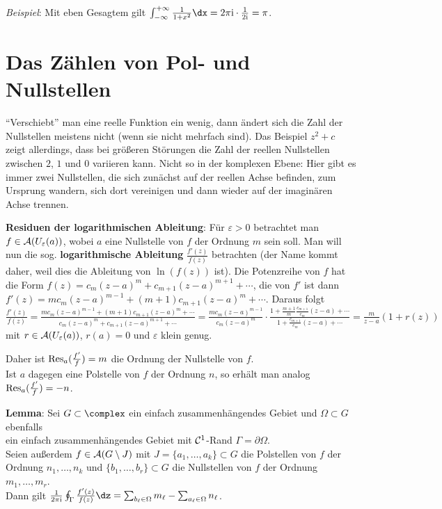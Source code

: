 \emph{Beispiel}:
Mit eben Gesagtem gilt $\int_{-\infty}^{+\infty} \frac{1}{1 + x^2} \dx =
2\pi\i \cdot \frac{1}{2\i} = \pi$.

\pagebreak

\section{%
    Das Zählen von Pol- und Nullstellen%
}

"`Verschiebt"' man eine reelle Funktion ein wenig, dann ändert sich die
Zahl der Nullstellen meistens nicht (wenn sie nicht mehrfach sind).
Das Beispiel $z^2 + c$ zeigt allerdings, dass bei größeren Störungen
die Zahl der reellen Nullstellen zwischen $2$, $1$ und $0$ variieren kann.
Nicht so in der komplexen Ebene:
Hier gibt es immer zwei Nullstellen, die sich zunächst auf der reellen Achse
befinden, zum Ursprung wandern, sich dort vereinigen und dann wieder auf
der imaginären Achse trennen.

\linie

\textbf{Residuen der logarithmischen Ableitung}:
Für $\varepsilon > 0$ betrachtet man $f \in \mathcal{A}(U_\varepsilon(a))$, wobei
$a$ eine Nullstelle von $f$ der Ordnung $m$ sein soll.
Man will nun die sog. \textbf{logarithmische Ableitung} $\frac{f'(z)}{f(z)}$
betrachten (der Name kommt daher, weil dies die Ableitung von $\ln(f(z))$ ist).
Die Potenzreihe von $f$ hat die Form
$f(z) = c_m (z - a)^m + c_{m+1} (z - a)^{m+1} + \dotsb$,
die von $f'$ ist dann
$f'(z) = m c_m (z - a)^{m-1} + (m + 1) c_{m+1} (z - a)^m + \dotsb$.
Daraus folgt\\
$\frac{f'(z)}{f(z)} =
\frac{m c_m (z - a)^{m-1} + (m + 1) c_{m+1} (z - a)^m + \dotsb}
{c_m (z - a)^m + c_{m+1} (z - a)^{m+1} + \dotsb} =
\frac{m c_m (z - a)^{m-1}}{c_m (z - a)^m} \cdot
\frac{1 + \frac{m + 1}{m} \frac{c_{m+1}}{c_m} (z - a) + \dotsb}
{1 + \frac{c_{m+1}}{c_m} (z - a) + \dotsb} =
\frac{m}{z - a} (1 + r(z))$ mit $r \in \mathcal{A}(U_\varepsilon(a))$, $r(a) = 0$ und
$\varepsilon$ klein genug.

Daher ist $\operatorname{Res}_a(\frac{f'}{f}) = m$ die Ordnung der Nullstelle von $f$.\\
Ist $a$ dagegen eine Polstelle von $f$ der Ordnung $n$, so erhält man analog
$\operatorname{Res}_a(\frac{f'}{f}) = -n$.

\linie

\textbf{Lemma}:
Sei $G \subset \complex$ ein einfach zusammenhängendes Gebiet und
$\Omega \subset G$ ebenfalls\\
ein einfach zusammenhängendes Gebiet mit
$\mathcal{C}^1$-Rand $\Gamma = \partial \Omega$.\\
Seien außerdem $f \in \mathcal{A}(G \setminus J)$ mit
$J = \{a_1, \dotsc, a_k\} \subset G$ die
Polstellen von $f$ der Ordnung $n_1, \dotsc, n_k$ und
$\{b_1, \dotsc, b_r\} \subset G$ die Nullstellen von $f$
der Ordnung $m_1, \dotsc, m_r$.\\
Dann gilt $\frac{1}{2\pi\i} \oint_\Gamma \frac{f'(z)}{f(z)} \dz =
\sum_{b_\ell \in \Omega} m_\ell - \sum_{a_\ell \in \Omega} n_\ell$.

